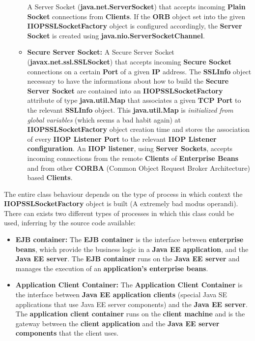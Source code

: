 \begin{itemize}
\begin{itemize}
				A Server Socket (\textbf{java.net.ServerSocket}) that accepts incoming \textbf{Plain Socket} connections from \textbf{Clients}. If the \textbf{ORB} object set into the given \textbf{IIOPSSLSocketFactory} object is configured accordingly, the \textbf{Server Socket} is created using \textbf{java.nio.ServerSocketChannel}.
			\item \textbf{Secure Server Socket:}
				A Secure Server Socket (\textbf{javax.net.ssl.SSLSocket}) that accepts incoming \textbf{Secure Socket} connections on a certain \textbf{Port} of a given \textbf{IP} address.
				The \textbf{SSLInfo} object necessary to have the informations about how to build the \textbf{Secure Server Socket} are contained into an \textbf{IIOPSSLSocketFactory} attribute of type \textbf{java.util.Map} that associates a given \textbf{TCP Port} to the relevant \textbf{SSLInfo} object.
				This \textbf{java.util.Map} is \textit{initialized from global variables} (which seems a bad habit again) at \textbf{IIOPSSLSocketFactory} object creation time and stores the association of every \textbf{IIOP Listener Port} to the relevant \textbf{IIOP Listener configuration}.
				An \textbf{IIOP listener}, using \textbf{Server Sockets}, accepts incoming connections from the remote \textbf{Clients} of \textbf{Enterprise Beans} and from other \textbf{CORBA} (Common Object Request Broker Architecture) based \textbf{Clients}.
		\end{itemize}
\end{itemize}
The entire class behaviour depends on the type of process in which context the \textbf{IIOPSSLSocketFactory} object is built (A extremely bad modus operandi).
There can exists two different types of processes in which this class could be used, inferring by the source code available:
\begin{itemize}
	\item \textbf{EJB container:}
		The \textbf{EJB container} is the interface between \textbf{enterprise beans}, which provide the business logic in a \textbf{Java EE application}, and the \textbf{Java EE server}. The \textbf{EJB container} runs on the \textbf{Java EE server} and manages the execution of an \textbf{application's enterprise beans}.
	\item \textbf{Application Client Container:}
		The \textbf{Application Client Container} is the interface between \textbf{Java EE application clients} (special Java SE applications that use Java EE server components) and the \textbf{Java EE server}. The \textbf{application client container} runs on the \textbf{client machine} and is the gateway between the \textbf{client application} and the \textbf{Java EE server components} that the client uses.
\end{itemize}

